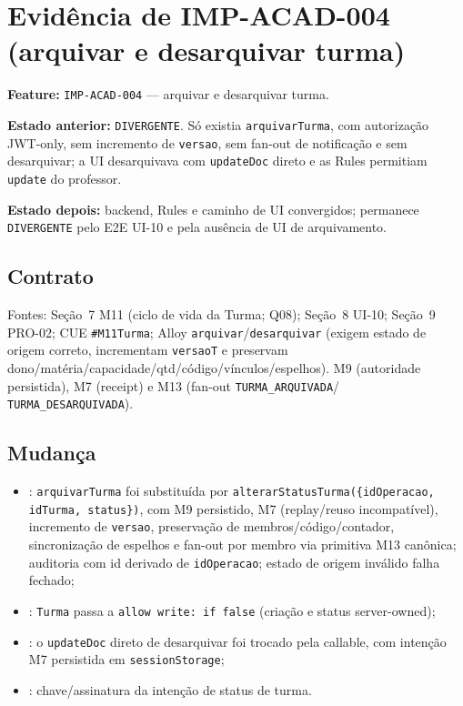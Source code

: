 \section{Evidência de IMP-ACAD-004 (arquivar e desarquivar turma)}

\textbf{Feature:} \texttt{IMP-ACAD-004} --- arquivar e desarquivar turma.

\textbf{Estado anterior:} \texttt{DIVERGENTE}. Só existia \texttt{arquivarTurma},
com autorização JWT-only, sem incremento de \texttt{versao}, sem fan-out de
notificação e sem desarquivar; a UI desarquivava com \texttt{updateDoc} direto e
as Rules permitiam \texttt{update} do professor.

\textbf{Estado depois:} backend, Rules e caminho de UI convergidos; permanece
\texttt{DIVERGENTE} pelo E2E UI-10 e pela ausência de UI de arquivamento.

\subsection{Contrato}

Fontes: Seção~7 M11 (ciclo de vida da Turma; Q08); Seção~8 UI-10; Seção~9
PRO-02; CUE \texttt{\#M11Turma}; Alloy \texttt{arquivar}/\texttt{desarquivar}
(exigem estado de origem correto, incrementam \texttt{versaoT} e preservam
dono/matéria/capacidade/qtd/código/vínculos/espelhos). M9 (autoridade
persistida), M7 (receipt) e M13 (fan-out \texttt{TURMA\_ARQUIVADA}/
\texttt{TURMA\_DESARQUIVADA}).

\subsection{Mudança}

\begin{itemize}
  \item {}: \texttt{arquivarTurma} foi substituída
  por \texttt{alterarStatusTurma(\{idOperacao, idTurma, status\})}, com M9
  persistido, M7 (replay/reuso incompatível), incremento de \texttt{versao},
  preservação de membros/código/contador, sincronização de espelhos e fan-out
  por membro via primitiva M13 canônica; auditoria com id derivado de
  \texttt{idOperacao}; estado de origem inválido falha fechado;
  \item {}: \texttt{Turma} passa a \texttt{allow write: if false}
  (criação e status server-owned);
  \item {}: o
  \texttt{updateDoc} direto de desarquivar foi trocado pela callable, com
  intenção M7 persistida em \texttt{sessionStorage};
  \item {}: chave/assinatura da
  intenção de status de turma.
\end{itemize}

